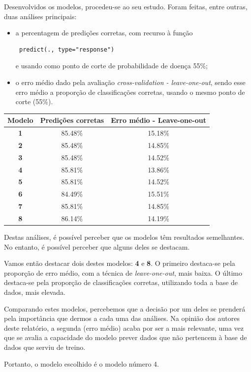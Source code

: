\documentclass[a4paper]{report}
\begin{document}
{	Desenvolvidos os modelos, procedeu-se ao seu estudo. Foram feitas, entre outras, duas análises principais:
	\begin{itemize}
		\item a percentagem de predições corretas, com recurso à função \begin{verbatim} predict(., type="response") \end{verbatim} e usando como ponto de corte de probabilidade de doença 55\%;
		\item o erro médio dado pela avaliação \textit{cross-validation - leave-one-out}, sendo esse erro médio a proporção de classificações corretas, usando o mesmo ponto de corte (55\%).
	\end{itemize}
	\begin{center}
		\begin{tabular}{ | c | c | c | }
		\hline
		\textbf{Modelo} & \textbf{Predições corretas} & \textbf{Erro médio - Leave-one-out} \\ 
		\hline
		\textbf{1} & 85.48\% & 15.18\% \\ 
		\hline
		\textbf{2} & 85.48\% & 14.85\% \\
		\hline
		\textbf{3} & 85.48\% & 14.52\% \\
		\hline
		\textbf{4} & 85.81\% & 13.86\% \\
		\hline
		\textbf{5} & 85.81\% & 14.52\% \\
		\hline
		\textbf{6} & 84.49\% & 15.51\% \\
		\hline
		\textbf{7} & 85.81\% & 14.85\% \\
		\hline								   	
		\textbf{8} & 86.14\% & 14.19\% \\
		\hline
		\end{tabular}
	\end{center}

	Destas análises, é possível perceber que os modelos têm resultados semelhantes. No entanto, é possível perceber que alguns deles se destacam.

	Vamos então destacar dois destes modelos: \textbf{4} e \textbf{8}. O primeiro destaca-se pela proporção de erro médio, com a técnica de \textit{leave-one-out}, mais baixa.
	O último destaca-se pela proporção de classificações corretas, utilizando toda a base de dados, mais elevada.

	Comparando estes modelos, percebemos que a decisão por um deles se prenderá pela importância que dermos a cada uma das análises.
	Na opinião dos autores deste relatório, a segunda (erro médio) acaba por ser a mais relevante, uma vez que se avalia a capacidade do modelo prever dados que não pertencem à base de dados que serviu de treino.

	Portanto, o modelo escolhido é o modelo número 4.
}
\end{document}
